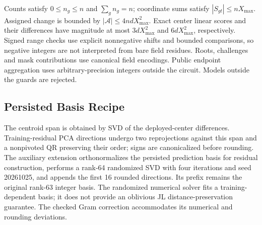 Counts satisfy $0\leq n_g\leq n$ and $\sum_g n_g=n$;
coordinate sums satisfy $|S_{gt}|\leq nX_{\max}$. Assigned change is bounded
by $|\mathcal A|\leq4ndX_{\max}^2$. Exact center linear scores and their
differences have magnitude at most $3dX_{\max}^2$ and $6dX_{\max}^2$,
respectively. Signed range checks use explicit nonnegative shifts and
bounded comparisons, so negative integers are not interpreted from bare
field residues. Roots, challenges and mask contributions use canonical
field encodings. Public endpoint aggregation uses arbitrary-precision
integers outside the circuit. Models outside the guards are rejected.

\subsection{Persisted Basis Recipe}
The centroid span is obtained by SVD of the deployed-center differences.
Training-residual PCA directions undergo two reprojections against this
span and a nonpivoted QR preserving their order; signs are canonicalized
before rounding. The auxiliary extension orthonormalizes the persisted
prediction basis for residual construction, performs a rank-64 randomized
SVD with four iterations and seed 20261025, and appends the first 16 rounded
directions. Its prefix remains the original rank-63 integer basis. The
randomized numerical solver fits a training-dependent basis; it does not
provide an oblivious JL distance-preservation guarantee. The checked
Gram correction accommodates its numerical and rounding deviations.
